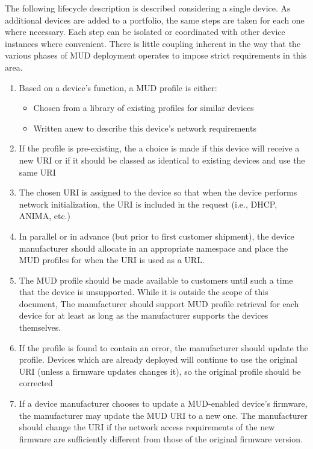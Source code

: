 \documentclass[conference]{IEEEtran}
\begin{document}
The following lifecycle description is described considering a single
device.  As additional devices are added to a portfolio, the same
steps are taken for each one where necessary.  Each step can be
isolated or coordinated with other device instances where convenient.
There is little coupling inherent in the way that the various phases
of MUD deployment operates to impose strict requirements in this area.

\begin{enumerate}
\item Based on a device's function, a MUD profile is either:
  \begin{itemize}
  \item Chosen from a library of existing profiles for similar devices
    
  \item Written anew to describe this device's network requirements
  \end{itemize}
\item If the profile is pre-existing, the a choice is made if this
  device will receive a new URI or if it should be classed as
  identical to existing devices and use the same URI
 
\item The chosen URI is assigned to the device so that when the device
  performs network initialization, the URI is included in the request
  (i.e., DHCP, ANIMA, etc.)
 
\item In parallel or in advance (but prior to first customer
  shipment), the device manufacturer should allocate in an appropriate
  namespace and place the MUD profiles for when the URI is used as a
  URL.
 
\item The MUD profile should be made available to customers until such
  a time that the device is unsupported.  While it is outside the
  scope of this document, The manufacturer should support MUD profile
  retrieval for each device for at least as long as the manufacturer
  supports the devices themselves.

\item If the profile is found to contain an error, the manufacturer
  should update the profile.  Devices which are already deployed will
  continue to use the original URI (unless a firmware updates changes
  it), so the original profile should be corrected
 
\item If a device manufacturer chooses to update a MUD-enabled
  device's firmware, the manufacturer may update the MUD URI to a new
  one.  The manufacturer should change the URI if the network access
  requirements of the new firmware are sufficiently different from
  those of the original firmware version.
\end{enumerate}
\end{document}
